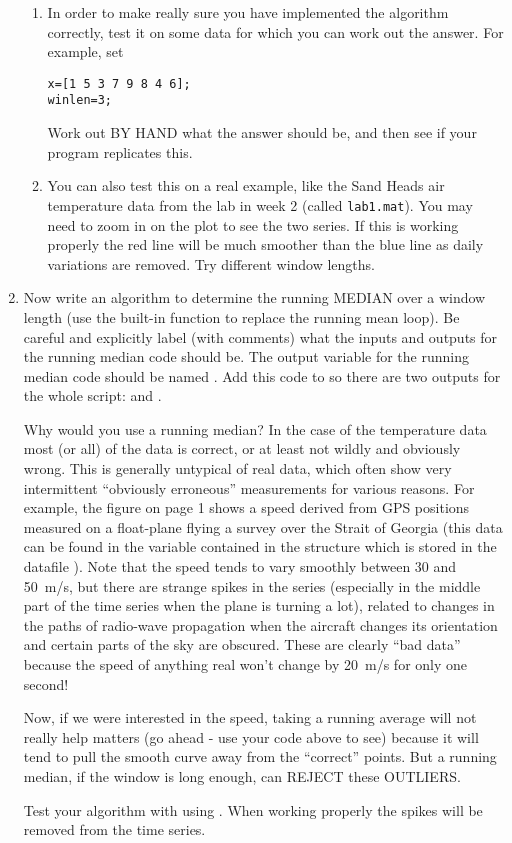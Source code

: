 \documentclass[letterpaper,11pt]{article}
\begin{document}
\begin{enumerate}
\begin{enumerate}
\item In order to make really sure you have implemented the algorithm correctly, test
it on some data for which you can work out the answer. For example, set
\begin{lstlisting}
x=[1 5 3 7 9 8 4 6];
winlen=3;
\end{lstlisting}
Work out BY HAND what the answer should be, and then see if your program replicates this.

\item You can also test this on a real example, like the Sand Heads air temperature data from the lab in week 2 (called \verb+lab1.mat+). 
You may need to zoom
in on the plot to see the two series. If this is working properly the red line will be much
smoother than the blue line as daily variations are removed. Try different window lengths.

 
\end{enumerate}


\item Now write an algorithm to determine the running MEDIAN over a
window length  (use
the built-in function  to replace the running mean loop). Be careful and explicitly
label (with comments) what the inputs and outputs for the running median code should be.
The output variable for the running median code should be named .
Add this code to  so there are two outputs for the whole script:  and .
 
Why would you use a running median? In the case of the temperature data most (or all)
of the data is correct, or at least not wildly and obviously wrong. This is generally
untypical of real data, which often show very intermittent ``obviously
erroneous'' measurements for various reasons. For example, the figure
on page 1 shows a speed derived from GPS positions measured on a float-plane
flying a survey over the Strait of Georgia (this data can be found in  
the variable  contained in the structure  which is stored in
the datafile ). Note that the speed
tends to vary smoothly between 30 and 50~m/s, but there 
are strange spikes in the series (especially in the middle part of
the time series when the plane is turning a lot), related to changes in the paths of
radio-wave propagation when the aircraft changes its orientation and certain parts of the sky are obscured. 
These are clearly
``bad data'' because the speed of anything real won't change by 20~m/s for only one second!
 
 
Now, if we were interested in the speed, 
taking a running average will not really help matters (go ahead - use
your code above to see) because it will tend to pull the smooth curve away from the ``correct'' points.
But a running median, if the window is long enough,
can REJECT these OUTLIERS.  
 
Test your algorithm with  using . When working 
properly the spikes will be removed from the time series.

 
\end{enumerate}
\end{document}
